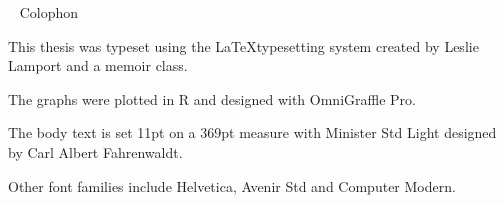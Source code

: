 \documentclass[a4paper,11pt]{memoir}
\theoremstyle{definition}
\renewcommand{\chaptermark}[1]{\markboth{#1}{}}
\begin{document}
% 
\clearpage
\pagestyle{empty}
\null\vfil

\begin{adjustwidth}{1.15in}{1.15in}
\begin{center}
{\Large\    %
{Colophon}}
\end{center}
\begin{center}
This thesis was typeset using the \LaTeX\;typesetting system created by Leslie Lamport and a memoir class. 

The graphs were plotted in R and designed with OmniGraffle Pro. 

The body text is set 11pt on a 369pt measure with Minister Std Light designed by Carl Albert Fahrenwaldt. 

Other font families include Helvetica, Avenir Std and Computer Modern.

\end{center}

\end{adjustwidth}

\vfil
\clearpage
 
\end{document}
